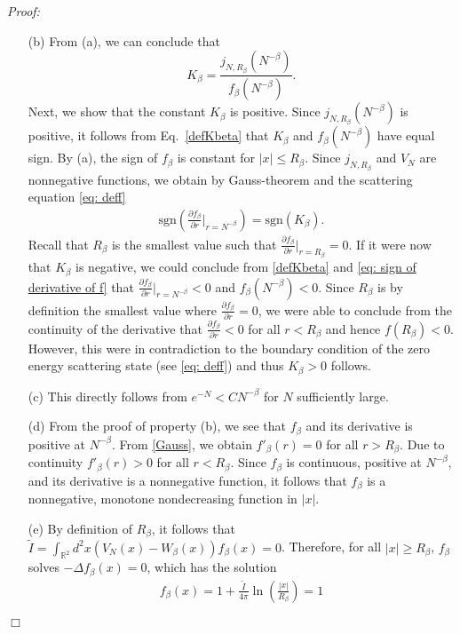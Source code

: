 \documentclass[11pt, english, american]{article}
\newenvironment{proof}{\emph{Proof:}}{\begin{flushright} $ \Box $ \end{flushright}}
\begin{document}
\begin{proof}
\begin{enumerate}
\item[(b)]
From (a), we can conclude that
\begin{equation}
\label{defKbeta}
K_{\beta} = \frac{j_{N,R_\beta}(N^{-\beta})}{f_\beta(N^{-\beta})}.
\end{equation}
Next, we show that the constant $K_\beta$ is positive.
Since $j_{N,R_\beta}(N^{-\beta})$ is positive, it follows from Eq.~\eqref{defKbeta} that  $K_\beta$ and $f_\beta (N^ {-\beta})$ have equal sign. By (a), the sign of $f_\beta$ is constant for $|x|\leq R_\beta$.
Since $j_{N,R_\beta}$ and $V_N$ are nonnegative functions,
we obtain by Gauss-theorem and the scattering equation \eqref{eq: deff}
\begin{align}
\label{eq: sign of derivative of f}
\text{sgn} \left(\frac{\partial f_\beta}{\partial r}|_{r= N^{- \beta}}\right) = \text{sgn}(K_\beta).
\end{align}
Recall that $R_\beta$ is the smallest value such that
  $\frac{\partial f_\beta}{\partial r} \big|_{r=R_\beta} = 0$.
If it were now that $K_\beta$ is negative, we could conclude from \eqref{defKbeta} and \eqref{eq: sign of derivative of f} that
$\frac{\partial f_\beta}{\partial r}|_{r= N^{- \beta}} <0$ and
$ f_\beta ( N^{- \beta}) <0$. 
Since $R_\beta$ is by definition the smallest value where $\frac{\partial f_\beta}{\partial r} = 0$, we were able to conclude from the continuity of the derivative that  $\frac{\partial f_\beta}{\partial r} <0$ for all $r < R_\beta$ and hence $f(R_\beta) <0$. However, this were in contradiction to the boundary condition of the zero energy scattering state (see \eqref{eq: deff}) and thus $K_\beta > 0$ follows.







\item[(c)] This directly follows from $e^{-N} < C N^{- \beta}$ for $N$ sufficiently large.

\item[(d)]
From the proof of property (b), we see that $f_\beta$ and its derivative is positive at $N^{- \beta}$. 
From \eqref{Gauss}, we obtain $f'_\beta(r) = 0 $ for all  $r > R_\beta$. Due to continuity $f'_{\beta}(r)  >0 $ for all  $r< R_\beta$. Since $f_\beta$ is continuous, positive at  $N^{- \beta}$, and its derivative is a nonnegative function, it follows that $f_\beta$ is a nonnegative, monotone nondecreasing function in $|x|$.


\item[(e)]
By definition of $R_\beta$, it follows that $\tilde{I}=\int_{\mathbb{R}^2}d^2x (V_N(x)-W_\beta(x)) f_\beta(x) =0$. Therefore, for all $|x|\geq R_\beta$, $f_\beta$ solves $-\Delta f_\beta(x)=0$, which has the solution
\begin{align*}
f_\beta(x)= 1 + \frac{\tilde{I}}{4 \pi} \ln \left( \frac{|x|}{R_\beta} \right)=1
\end{align*}



\end{enumerate}
\end{proof}
\end{document}
